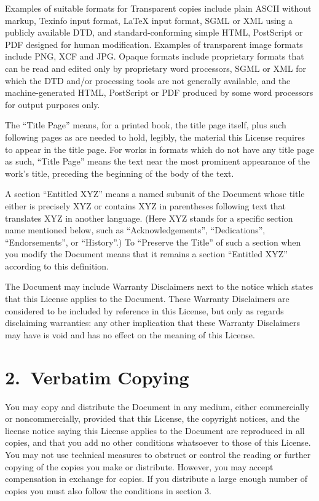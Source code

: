 Examples of suitable formats for Transparent copies include plain
ASCII without markup, Texinfo input format, \LaTeX{} input format,
SGML or XML using a publicly available DTD, and standard-conforming
simple HTML, PostScript or PDF designed for human modification.
Examples of transparent image formats include PNG, XCF and JPG\@.
Opaque formats include proprietary formats that can be read and edited
only by proprietary word processors, SGML or XML for which the DTD
and/or processing tools are not generally available, and the
machine-generated HTML, PostScript or PDF produced by some word
processors for output purposes only.

The ``Title Page'' means, for a printed book, the title page itself,
plus such following pages as are needed to hold, legibly, the material
this License requires to appear in the title page. For works in
formats which do not have any title page as such, ``Title Page'' means
the text near the most prominent appearance of the work's title,
preceding the beginning of the body of the text.

A section ``Entitled XYZ'' means a named subunit of the Document whose
title either is precisely XYZ or contains XYZ in parentheses following
text that translates XYZ in another language. (Here XYZ stands for a
specific section name mentioned below, such as ``Acknowledgements'',
``Dedications'', ``Endorsements'', or ``History''.)  To ``Preserve the
Title'' of such a section when you modify the Document means that it
remains a section ``Entitled XYZ'' according to this definition.

The Document may include Warranty Disclaimers next to the notice which
states that this License applies to the Document. These Warranty
Disclaimers are considered to be included by reference in this
License, but only as regards disclaiming warranties: any other
implication that these Warranty Disclaimers may have is void and has
no effect on the meaning of this License.



\section*{2.\ Verbatim Copying}

You may copy and distribute the Document in any medium, either
commercially or noncommercially, provided that this License, the
copyright notices, and the license notice saying this License applies
to the Document are reproduced in all copies, and that you add no
other conditions whatsoever to those of this License. You may not use
technical measures to obstruct or control the reading or further
copying of the copies you make or distribute. However, you may accept
compensation in exchange for copies. If you distribute a large enough
number of copies you must also follow the conditions in section 3.

